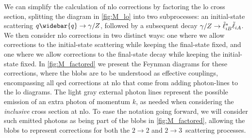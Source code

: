 
We can simplify the calculation of \gls{nlo} corrections by factoring the \gls{lo} cross section, splitting the diagram in \cref{fig:M_lo} into two subprocesses: an initial-state scattering $q\widebar{q}\to\gamma/Z$, followed by a subsequent decay $\gamma/Z\to{\tilde{\ell}}_{iB}^*{\tilde{\ell}}_{iA}$.
We then consider \gls{nlo} corrections in two distinct ways: one where we allow corrections to the initial-state scattering while keeping the final-state fixed, and one where we allow corrections to the final-state decay while keeping the initial-state fixed.
In \cref{fig:M_factored} we present the Feynman diagrams for these corrections, 
where the blobs are to be understood as effective couplings, encompassing all \gls{qed} corrections at \gls{nlo} that come from adding photon-lines to the \gls{lo} diagrams.
The light gray external photon lines represent the possible emission of an extra photon of momentum $k$, as needed when considering the \textit{inclusive} cross section at \gls{nlo}.
To ease the notation going forward, we will consider such emitted photons as being part of the blobs in \cref{fig:M_factored}, allowing the blobs to represent corrections for both the $2\to2$ and $2\to3$~scattering processes.

